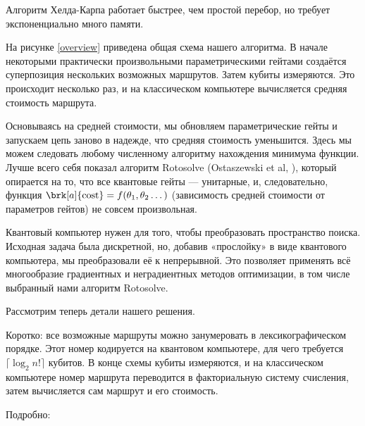 Алгоритм Хелда-Карпа работает быстрее, чем простой перебор, но требует экспоненциально много памяти. %








На рисунке \ref{overview} приведена общая схема нашего алгоритма. В начале некоторыми практически произвольными параметрическими гейтами создаётся суперпозиция нескольких возможных маршрутов. Затем кубиты измеряются. Это происходит несколько раз, и на классическом компьютере вычисляется средняя стоимость маршрута.


Основываясь на средней стоимости, мы обновляем параметрические гейты и запускаем цепь заново в надежде, что средняя стоимость уменьшится. Здесь мы можем следовать любому численному алгоритму нахождения минимума функции. 
Лучше всего себя показал алгоритм Rotosolve 
(Ostaszewski et al, ),
который опирается на то, что все квантовые гейты --- унитарные, и, следовательно, функция $\brk[a]{\text{cost}} = f(\theta_1, \theta_2 \dots)$ (зависимость средней стоимости от параметров гейтов) не совсем произвольная.

Квантовый компьютер нужен для того, чтобы преобразовать пространство поиска. Исходная задача была дискретной, но, добавив «прослойку» в виде квантового компьютера, мы преобразовали её к непрерывной. Это позволяет применять всё многообразие градиентных и неградиентных методов оптимизации, в том числе выбранный нами алгоритм Rotosolve.

Рассмотрим теперь детали нашего решения.




Коротко: все возможные маршруты можно занумеровать в лексикографическом порядке. Этот номер кодируется на квантовом компьютере, для чего требуется $\lceil \log_2 n! \rceil$ кубитов. В конце схемы кубиты измеряются, и на классическом компьютере номер маршрута переводится в факториальную систему счисления, затем вычисляется сам маршрут и его стоимость.


Подробно:

